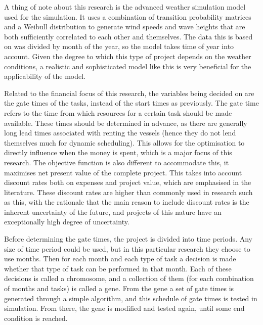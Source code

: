 \documentclass[a4paper,12pt]{article}
\begin{document}
A thing of note about this research is the advanced weather simulation model used for the simulation. It uses a combination of transition probability matrices and a Weibull distribution to generate wind speeds and wave heights that are both sufficiently correlated to each other and themselves. The data this is based on was divided by month of the year, so the model takes time of year into account. Given the degree to which this type of project depends on the weather conditions, a realistic and sophisticated model like this is very beneficial for the applicability of the model. 

Related to the financial focus of this research, the variables being decided on are the gate times of the tasks, instead of the start times as previously. The gate time refers to the time from which resources for a certain task should be made available. These times should be determined in advance, as there are generally long lead times associated with renting the vessels (hence they do not lend themselves much for dynamic scheduling). This allows for the optimisation to directly influence when the money is spent, which is a major focus of this research. The objective function is also different to accommodate this, it maximises net present value of the complete project. This takes into account discount rates both on expenses and project value, which are emphasised in the literature. These discount rates are higher than commonly used in research such as this, with the rationale that the main reason to include discount rates is the inherent uncertainty of the future, and projects of this nature have an exceptionally high degree of uncertainty.

Before determining the gate times, the project is divided into time periods. Any size of time period could be used, but in this particular research they choose to use months. Then for each month and each type of task a decision is made whether that type of task can be performed in that month. Each of these decisions is called a chromosome, and a collection of them (for each combination of months and tasks) is called a gene. From the gene a set of gate times is generated through a simple algorithm, and this schedule of gate times is tested in simulation. From there, the gene is modified and tested again, until some end condition is reached. 
\end{document}

